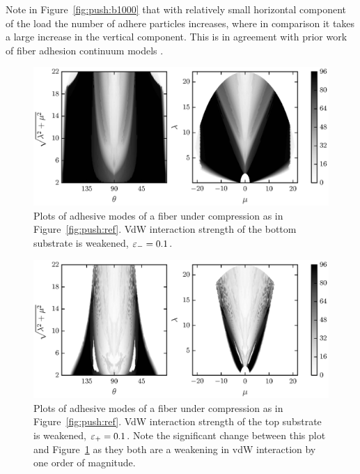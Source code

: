 Note in Figure~\ref{fig:push:b1000} that with relatively small horizontal component of the load the number of adhere particles increases, where in comparison it takes a large increase in the vertical component. This is in agreement with prior work of fiber adhesion continuum models \cite{Majidi2009}.

	\begin{figure}[t]
		\begin{center}
			\includegraphics{./fig/ch3/push/eb0.1/grid.eps}
		\end{center}		
		\caption{Plots of adhesive modes of a fiber under compression as in Figure~\ref{fig:push:ref}. VdW interaction strength of the bottom substrate is weakened, $\varepsilon_-=0.1$.
		\label{fig:push:eb0.1}}
	\end{figure}	

	\begin{figure}[t]
		\begin{center}
			\includegraphics{./fig/ch3/push/et0.1/grid.eps}
		\end{center}		
		\caption{Plots of adhesive modes of a fiber under compression as in Figure~\ref{fig:push:ref}. VdW interaction strength of the top substrate is weakened, $\varepsilon_+=0.1$. Note the significant change between this plot and Figure~\ref{fig:push:eb0.1} as they both are a weakening in vdW interaction by one order of magnitude.
		\label{fig:push:et0.1}}
	\end{figure}


